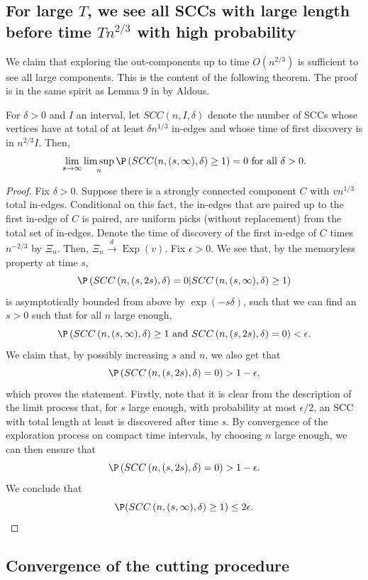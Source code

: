\subsection{For large $T$, we see all SCCs with large length before time $Tn^{2/3}$ with high probability}
We claim that exploring the out-components up to time $O(n^{2/3})$ is sufficient to see all large components. This is the content of the following theorem. The proof is in the same spirit as Lemma 9 in \cite{aldous_1991} by Aldous. 
\begin{lemma}
For $\delta>0$ and $I$ an interval, let $SCC(n,I,\delta)$ denote the number of SCCs whose vertices have at total of at least $\delta n^{1/3}$ in-edges and whose time of first discovery is in $n^{2/3}I$. Then,
$$\lim_{s\to \infty}\limsup_{n} \P\left(SCC(n,(s,\infty),\delta)\geq 1\right)=0\text{ for all }\delta>0.$$
\end{lemma}
\begin{proof}
Fix $\delta>0$. Suppose there is a strongly connected component $C$ with $vn^{1/3}$ total in-edges. Conditional on this fact, the in-edges that are paired up to the first in-edge of $C$ is paired, are uniform picks (without replacement) from the total set of in-edges. Denote the time of discovery of the first in-edge of $C$ times $n^{-2/3}$ by $\Xi_n$. Then, $\Xi_n\overset{d}{\to}\operatorname{Exp}(v)$. Fix $\epsilon>0$. We see that, by the memoryless property at time $s$,
$$\P\left(SCC\left(n,(s,2s),\delta\right)=0|SCC\left(n,(s,\infty),\delta\right)\geq 1\right)$$
is asymptotically bounded from above by 
$\exp(-s\delta)$, such that we can find an $s>0$ such that for all $n$ large enough,
$$\P\left(SCC\left(n,(s,\infty),\delta\right)\geq 1 \text{ and }SCC\left(n,(s,2s),\delta\right)=0\right)<\epsilon.$$
We claim that, by possibly increasing $s$ and $n$, we also get that 
$$\P\left(SCC\left(n,(s,2s),\delta\right)=0\right)>1-\epsilon,$$
which proves the statement.
Firstly, note that it is clear from the description of the limit process that, for $s$ large enough, with probability at most $\epsilon/2$, an SCC with total length at least  is discovered after time $s$. By convergence of the exploration process on compact time intervals, by choosing $n$ large enough, we can then ensure that 
$$\P\left(SCC\left(n,(s,2s),\delta\right)=0\right)>1-\epsilon.$$
We conclude that 
$$\P(SCC\left(n,(s,\infty),\delta\right)\geq 1)\leq 2\epsilon.$$
\end{proof}
\subsection{Convergence of the cutting procedure}
